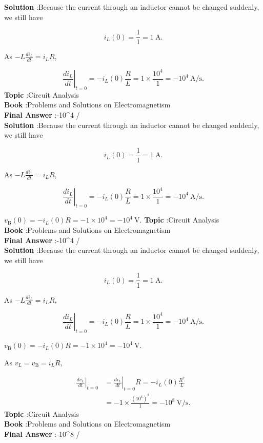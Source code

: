 \documentclass[10pt]{article}
\begin{document}
\textbf{Solution} :Because the current through an inductor cannot be changed suddenly, we still have

$$
i_{L}(0)=\frac{1}{1}=1 \mathrm{~A} .
$$

 As $-L \frac{d i_{L}}{d t}=i_{L} R$,

$$
\left.\frac{d i_{L}}{d t}\right|_{t=0}=-i_{L}(0) \frac{R}{L}=1 \times \frac{10^{4}}{1}=-10^{4} \mathrm{~A} / \mathrm{s} .
$$
\textbf{Topic} :Circuit Analysis\\
\textbf{Book} :Problems and Solutions on Electromagnetism\\
\textbf{Final Answer} :-10^{4}  / \\


\textbf{Solution} :Because the current through an inductor cannot be changed suddenly, we still have

$$
i_{L}(0)=\frac{1}{1}=1 \mathrm{~A} .
$$

 As $-L \frac{d i_{L}}{d t}=i_{L} R$,

$$
\left.\frac{d i_{L}}{d t}\right|_{t=0}=-i_{L}(0) \frac{R}{L}=1 \times \frac{10^{4}}{1}=-10^{4} \mathrm{~A} / \mathrm{s} .
$$

 $v_{\mathrm{B}}(0)=-i_{L}(0) R=-1 \times 10^{4}=-10^{4} \mathrm{~V}$.
\textbf{Topic} :Circuit Analysis\\
\textbf{Book} :Problems and Solutions on Electromagnetism\\
\textbf{Final Answer} :-10^{4}  / \\


\textbf{Solution} :Because the current through an inductor cannot be changed suddenly, we still have

$$
i_{L}(0)=\frac{1}{1}=1 \mathrm{~A} .
$$

 As $-L \frac{d i_{L}}{d t}=i_{L} R$,

$$
\left.\frac{d i_{L}}{d t}\right|_{t=0}=-i_{L}(0) \frac{R}{L}=1 \times \frac{10^{4}}{1}=-10^{4} \mathrm{~A} / \mathrm{s} .
$$

 $v_{\mathrm{B}}(0)=-i_{L}(0) R=-1 \times 10^{4}=-10^{4} \mathrm{~V}$.

 As $v_{L}=v_{\mathrm{B}}=i_{L} R$,

$$
\begin{aligned}
\left.\frac{d v_{L}}{d t}\right|_{t=0} &=\left.\frac{d i_{L}}{d t}\right|_{t=0} R=-i_{L}(0) \frac{R^{2}}{L} \\
&=-1 \times \frac{\left(10^{4}\right)^{2}}{1}=-10^{8} \mathrm{~V} / \mathrm{s} .
\end{aligned}
$$
\textbf{Topic} :Circuit Analysis\\
\textbf{Book} :Problems and Solutions on Electromagnetism\\
\textbf{Final Answer} :-10^{8}  / \\
\end{document}
